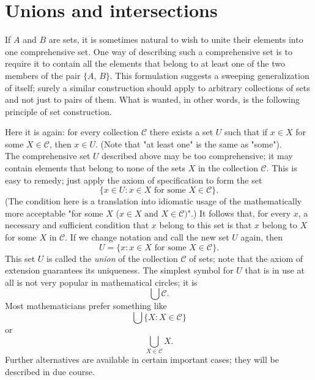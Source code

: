 \section{Unions and intersections}

If $A$ and $B$ are sets, it is sometimes natural to wish to unite their elements into one comprehensive set. One way of describing such a comprehensive set is to require it to contain all the elements that belong to at least one of the two members of the pair $\{A, \, B\}$. This formulation suggests a sweeping generalization of itself; surely a similar construction should apply to arbitrary collections of sets and not just to pairs of them. What is wanted, in other words, is the following principle of set construction.


Here it is again: for every collection $\mathcal{C}$ there exists a set $U$ such that if $x \in X$ for some $X \in \mathcal{C}$, then $x \in U$. (Note that "at least one" is the same as "some").\\

The comprehensive set $U$ described above may be too comprehensive; it may contain elements that belong to none of the sets $X$ in the collection $\mathcal{C}$. This is easy to remedy; just apply the axiom of specification to form the set
\[
	\{ x \in U : x \in X \text{ for some } X \in \mathcal{C}\}.
\]
(The condition here is a translation into idiomatic usage of the mathematically more acceptable "for some $X$ ($x \in X \text{ and } X \in \mathcal{C})$".) It follows that, for every $x$, a necessary and sufficient condition that $x$ belong to this set is that $x$ belong to $X$ for some $X$ in $\mathcal{C}$. If we change notation and call the new set $U$ again, then
\[
	U = \{x : x \in X \text{ for some } X \in \mathcal{C}\}.
\]
This set $U$ is called the \textit{union} of the collection $\mathcal{C}$ of sets; note that the axiom of extension guarantees its uniqueness. The simplest symbol for $U$ that is in use at all is not very popular in mathematical circles; it is
\[
	\bigcup \mathcal{C}.
\]
Most mathematicians prefer something like
\[
	\bigcup \{ X : X \in \mathcal{C}\}
\]
or
\[
	\bigcup_{X \in \mathcal{C}} X.
\]
Further alternatives are available in certain important cases; they will be described in due course.\\

